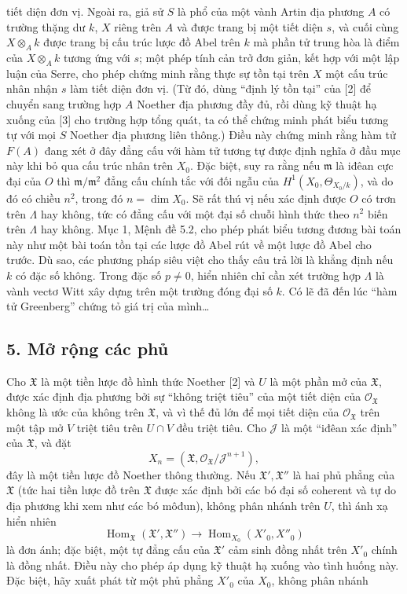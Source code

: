 \documentclass[11pt,twoside,openany]{book}
\numberwithin{equation}{section}
\newcommand{\src}[1]{%
  \phantomsection\hypertarget{src:\fgasourceid:#1}{}%
  \marginpar{\raggedleft\footnotesize\sffamily #1}%
}
\newcommand{\fgasourceid}{unset}
\begin{document}
\src{387}
tiết diện đơn vị. Ngoài ra, giả sử $S$ là phổ của một vành Artin địa phương
$A$ có trường thặng dư $k$, $X$ riêng trên $A$ và được trang bị một tiết diện
$s$, và cuối cùng $X\otimes_Ak$ được trang bị cấu trúc lược đồ Abel trên $k$
mà phần tử trung hòa là điểm của $X\otimes_Ak$ tương ứng với $s$; một phép
tính cản trở đơn giản, kết hợp với một lập luận của Serre, cho phép chứng minh
rằng thực sự tồn tại trên $X$ một cấu trúc nhân nhận $s$ làm tiết diện đơn vị.
(Từ đó, dùng ``định lý tồn tại'' của [2] để chuyển sang trường hợp $A$ Noether
địa phương đầy đủ, rồi dùng kỹ thuật hạ xuống của [3] cho trường hợp tổng quát,
ta có thể chứng minh phát biểu tương tự với mọi $S$ Noether địa phương liên
thông.) Điều này chứng minh rằng hàm tử $F(A)$ đang xét ở đây đẳng cấu với hàm
tử tương tự được định nghĩa ở đầu mục này khi bỏ qua cấu trúc nhân trên $X_0$.
Đặc biệt, suy ra rằng nếu $\mathfrak m$ là iđêan cực đại của $O$ thì
$\mathfrak m/\mathfrak m^2$ đẳng cấu chính tắc với đối ngẫu của
$H^1(X_0,\Theta_{X_0/k})$, và do đó có chiều $n^2$, trong đó
$n=\dim X_0$. Sẽ rất thú vị nếu xác định được $O$ có trơn trên $\Lambda$ hay
không, tức có đẳng cấu với một đại số chuỗi hình thức theo $n^2$ biến trên
$\Lambda$ hay không. Mục 1, Mệnh đề 5.2, cho phép phát biểu tương đương bài
toán này như một bài toán tồn tại các lược đồ Abel rút về một lược đồ Abel cho
trước. Dù sao, các phương pháp siêu việt cho thấy câu trả lời là khẳng định nếu
$k$ có đặc số không. Trong đặc số $p\ne0$, hiển nhiên chỉ cần xét trường hợp
$\Lambda$ là vành vectơ Witt xây dựng trên một trường đóng đại số $k$. Có lẽ
đã đến lúc ``hàm tử Greenberg'' chứng tỏ giá trị của mình\ldots

\subsection*{5. Mở rộng các phủ}

Cho $\mathfrak X$ là một tiền lược đồ hình thức Noether [2] và $U$ là một
phần mở của $\mathfrak X$, được xác định địa phương bởi sự ``không triệt tiêu''
của một tiết diện của $\mathcal O_{\mathfrak X}$ không là ước của không trên
$\mathfrak X$, và vì thế đủ lớn để mọi tiết diện của
$\mathcal O_{\mathfrak X}$ trên một tập mở $V$ triệt tiêu trên $U\cap V$ đều
triệt tiêu. Cho $\mathcal J$ là một ``iđêan xác định'' của $\mathfrak X$, và
đặt
\[
  X_n=(\mathfrak X,\mathcal O_{\mathfrak X}/\mathcal J^{n+1}),
\]
đây là một tiền lược đồ Noether thông thường. Nếu
$\mathfrak X',\mathfrak X''$ là hai phủ phẳng của $\mathfrak X$ (tức hai tiền
lược đồ trên $\mathfrak X$ được xác định bởi các bó đại số coherent và tự do
địa phương khi xem như các bó môđun), không phân nhánh trên $U$, thì ánh xạ
hiển nhiên
\[
  \operatorname{Hom}_{\mathfrak X}(\mathfrak X',\mathfrak X'')
  \longrightarrow
  \operatorname{Hom}_{X_0}(X'_0,X''_0)
\]
là đơn ánh; đặc biệt, một tự đẳng cấu của $\mathfrak X'$ cảm sinh đồng nhất
trên $X'_0$ chính là đồng nhất. Điều này cho phép áp dụng kỹ thuật hạ xuống vào
tình huống này. Đặc biệt, hãy xuất phát từ một phủ phẳng $X'_0$ của $X_0$,
không phân nhánh
\end{document}
